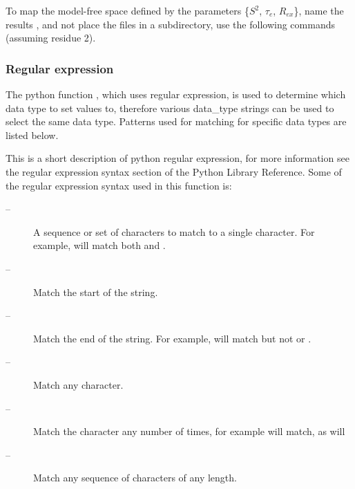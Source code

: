 




 To map the model-free space  defined by the parameters \{$S^2$, $\tau_e$, $R_{ex}$\}, name the results , and not place the files in a subdirectory, use the following commands (assuming residue 2). 
  



  
 \subsubsection{Regular expression} 

 The python function , which uses regular expression, is used to determine which data type to set values to, therefore various data\_type strings can be used to select the same data type.  Patterns used for matching for specific data types are listed below. 
  

 This is a short description of python regular expression, for more information see the regular expression syntax section of the Python Library Reference.  Some of the regular expression syntax used in this function is: 
  

 \begin{description} 
 \item[\quotecmd{[]} --]  A sequence or set of characters to match to a single character.  For example,  will match both  and .  
 \item[\quotecmd{\^{}} --]  Match the start of the string.  
 \item[\quotecmd{\$} --]  Match the end of the string.  For example,  will match  but not  or .  
 \item[ --]  Match any character.  
 \item[ --]  Match the character  any number of times, for example  will match, as will   
 \item[ --]  Match any sequence of characters of any length.  
 \end{description} 
  

